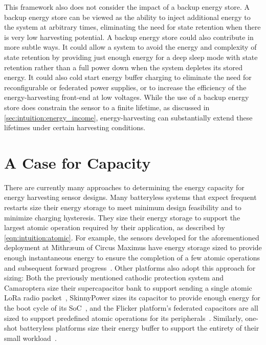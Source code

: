 This framework also does not consider the impact of a backup energy store.
A backup energy store can be viewed as the ability to inject additional energy
to the system at arbitrary times,
eliminating the need for state retention when there is very low
harvesting potential.
A backup energy store could also contribute in more subtle ways. It could
allow a system to avoid the energy and complexity of state retention by
providing just enough energy for a deep sleep mode with state retention rather
than a full power down when the system depletes its stored energy. It could also
cold start energy buffer charging to eliminate the need for reconfigurable
or federated power supplies, or to increase the efficiency of
the energy-harvesting front-end at low voltages.
While the use of a backup energy store
does constrain the sensor to a finite lifetime,
as discussed in \cref{sec:intuition:energy_income}, energy-harvesting can substantially extend these lifetimes under certain harvesting
conditions.

\section{A Case for Capacity}
\label{sec:intuition:capacity}
There are currently many approaches to determining the energy capacity for energy harvesting sensor designs. 
Many batteryless systems that expect frequent restarts size their energy storage to meet minimum design feasibility and to minimize charging hysteresis.
They size their energy storage to support the largest atomic operation required by their application, as described by 
\cref{eqn:intuition:atomic}. 
For example, the sensors developed for the aforementioned deployment at Mithræum of Circus Maximus have energy storage sized to provide enough instantaneous energy to ensure the completion of a few atomic operations and subsequent forward progress~\cite{afanasov2020battery}. Other platforms also adopt this approach for sizing: Both the previously mentioned cathodic protection system and Camaroptera size their supercapacitor bank to support sending a single atomic LoRa radio packet~\cite{nardello2019camaroptera,jagtap2021repurposing},  SkinnyPower sizes its capacitor to provide enough energy for the boot cycle of its SoC~\cite{shukla2019skinnypower}, and the Flicker platform's federated capacitors are all sized to support predefined atomic operations for its peripherals~\cite{hesterFlicker17}.
Similarly, one-shot batteryless platforms size their energy buffer to support the entirety of their small workload~\cite{yervaGrafting12,debruin2013monjolo,campbellEnergy14,campbellThermes14}.

